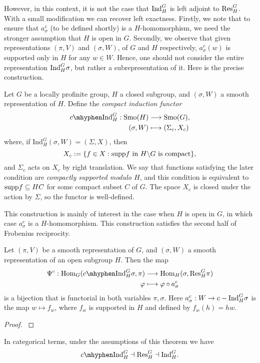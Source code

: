 However, in this context, it is not the case that $\mathrm{Ind}_H^G$ is left adjoint to $\mathrm{Res}_H^G$. With a small modification we can recover left exactness. Firstly, we note that to ensure that $a_\sigma^c$ (to be defined shortly) is a $H$-homomorphism, we need the stronger assumption that $H$ is open in $G$. Secondly, we observe that given representations $(\pi,V)$ and $(\sigma,W)$, of $G$ and $H$ respectively, $a_\sigma^c(w)$ is supported only in $H$ for any $w\in W$. Hence, one should not consider the entire representation $\mathrm{Ind}_H^G\sigma$, but rather a subrepresentation of it. Here is the precise construction.

\begin{defn}
	Let $G$ be a locally profinite group, $H$ a closed subgroup, and $(\sigma,W)$ a smooth representation of $H$. Define the \textit{compact induction functor} 
    \begin{align*}
        \cInd_H^G:\Smo(H)&\longrightarrow\Smo(G),\\
        (\sigma,W)&\longmapsto(\Sigma_c,X_c)
    \end{align*}
    where, if $\mathrm{Ind}_H^G(\sigma,W) = (\Sigma,X)$, then
    $$X_c:=\{f\in X: \mathrm{supp} f \text{ in } H\backslash G \text{ is compact}\},$$
    and $\Sigma_c$ acts on $X_c$ by right translation.
    We say that functions satisfying the later condition are \textit{compactly supported modulo $H$}, and this condition is equivalent to $\mathrm{supp} f\subseteq HC$ for some compact subset $C$ of $G$.
    The space $X_c$ is closed under the action by $\Sigma$, so the functor is well-defined.
\end{defn}

This construction is mainly of interest in the case when $H$ is open in $G$, in which case $a_\sigma^c$ is a $H$-homomorphism. This construction satisfies the second half of Frobenius reciprocity.

\begin{thm}\label{thm:frob2}
	Let $(\pi,V)$ be a smooth representation of $G$, and $(\sigma,W)$ a smooth representation of an open subgroup $H$. Then the map 
	\begin{align*}
		\Psi^c:\Hom_G(\cInd_H^G \sigma, \pi)&\longrightarrow \Hom_H(\sigma, \Res_H^G\pi)\\
		\varphi &\longmapsto \varphi \circ a^c_\sigma 
	\end{align*}
    is a bijection that is functorial in both variables $\pi,\sigma$. Here $a^c_\sigma: W\to c-\mathrm{Ind}_H^G \sigma$ is the map $w\mapsto f_w$, where $f_w$ is supported in $H$ and defined by $f_w(h) = hw$.
\end{thm}
\begin{proof}
    \cite[2.5 Theorem]{BH1}
\end{proof}
In categorical terms, under the assumptions of this theorem we have
$$\cInd_H^G\dashv\Res_H^G\dashv\Ind_H^G.$$
